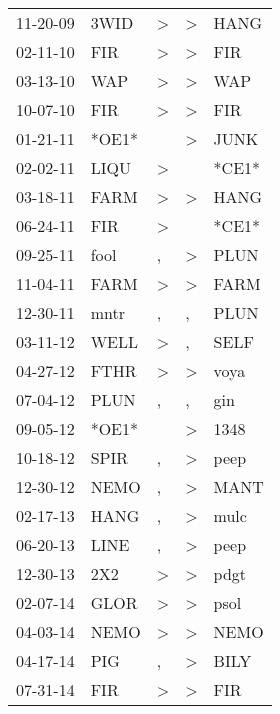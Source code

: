 \begin{supertabular}{lllll}
 11-20-09 &   3WID &  \textgreater &     \textgreater &   HANG \\
 02-11-10 &    FIR &  \textgreater &     \textgreater &    FIR \\
 03-13-10 &    WAP &  \textgreater &     \textgreater &    WAP \\
 10-07-10 &    FIR &  \textgreater &     \textgreater &    FIR \\
 01-21-11 &  *OE1* &               &     \textgreater &   JUNK \\
 02-02-11 &   LIQU &  \textgreater &                  &  *CE1* \\
 03-18-11 &   FARM &  \textgreater &     \textgreater &   HANG \\
 06-24-11 &    FIR &  \textgreater &                  &  *CE1* \\
 09-25-11 &   fool &             , &     \textgreater &   PLUN \\
 11-04-11 &   FARM &  \textgreater &     \textgreater &   FARM \\
 12-30-11 &   mntr &             , &                , &   PLUN \\
 03-11-12 &   WELL &  \textgreater &                , &   SELF \\
 04-27-12 &   FTHR &  \textgreater &     \textgreater &   voya \\
 07-04-12 &   PLUN &             , &                , &    gin \\
 09-05-12 &  *OE1* &               &     \textgreater &   1348 \\
 10-18-12 &   SPIR &             , &     \textgreater &   peep \\
 12-30-12 &   NEMO &             , &     \textgreater &   MANT \\
 02-17-13 &   HANG &             , &     \textgreater &   mulc \\
 06-20-13 &   LINE &             , &     \textgreater &   peep \\
 12-30-13 &    2X2 &  \textgreater &     \textgreater &   pdgt \\
 02-07-14 &   GLOR &  \textgreater &     \textgreater &   psol \\
 04-03-14 &   NEMO &  \textgreater &     \textgreater &   NEMO \\
 04-17-14 &    PIG &             , &     \textgreater &   BILY \\
 07-31-14 &    FIR &  \textgreater &     \textgreater &    FIR \\

\end{supertabular}

